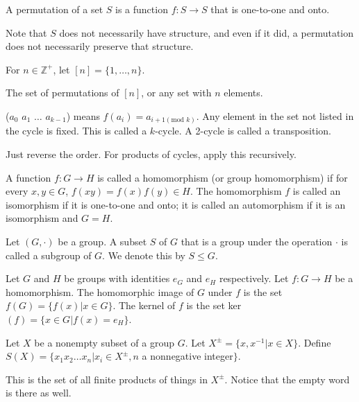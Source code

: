 \documentclass{article}
\newcommand\inv{^{-1}}
\newcommand{\Z}{\mathbb Z}
\begin{document}

A permutation of a set $S$ is a function $f:S\to S$ that is one-to-one and onto.

Note that $S$ does not necessarily have structure, and even if it did, a permutation does not necessarily preserve that structure.

\noindent{$\mathbf{[n]}$}

For $n\in \Z^+$, let $[n]=\{1,\hdots,n\}$.


The set of permutations of $[n]$, or any set with $n$ elements.


($a_0$ $a_1$ $\hdots$ $a_{k-1}$) means $f(a_i)=a_{i+1(\text{mod }k)}$. Any element in the set not listed in the cycle is fixed. This is called a $k$-cycle. A 2-cycle is called a transposition.


Just reverse the order. For products of cycles, apply this recursively.


A function $f:G \to H$ is called a homomorphism (or group homomorphism) if for every $x,y\in G$, $f(xy)=f(x)f(y)\in H$. The homomorphism $f$ is called an isomorphism if it is one-to-one and onto; it is called an automorphism if it is an isomorphism and $G=H$.


Let $(G,\cdot)$ be a group. A subset $S$ of $G$ that is a group under the operation $\cdot$ is called a subgroup of $G$. We denote this by $S \leq G$.


Let $G$ and $H$ be groups with identities $e_G$ and $e_H$ respectively. Let $f:G \to H$ be a homomorphism. The homomorphic image of $G$ under $f$ is the set $f(G) = \{f(x) | x\in G\}$. The kernel of $f$ is the set ker$(f)=\{x\in G|f(x)=e_H\}$.


Let $X$ be a nonempty subset of a group $G$. Let $X^\pm = \{x,x\inv|x\in X\}$. Define $S(X)=\{x_1x_2\hdots x_n|x_i\in X^\pm,n$ a nonnegative integer$\}$.

This is the set of all finite products of things in $X^\pm$. Notice that the empty word is there as well.

\end{document}
